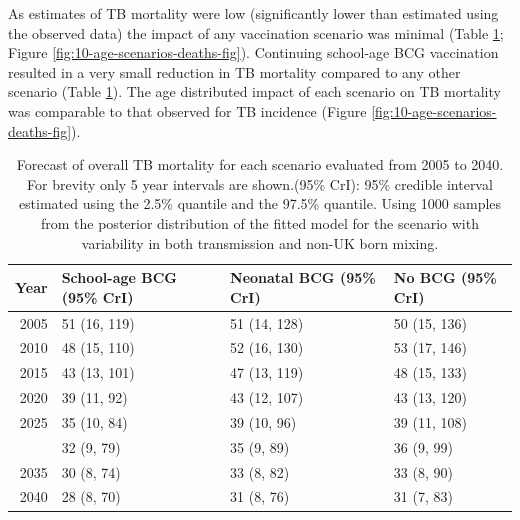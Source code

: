 \documentclass[11pt,twoside]{bristolthesis}
\begin{document}
  As estimates of TB mortality were low (significantly lower than estimated using the observed data) the impact of any vaccination scenario was minimal (Table \ref{tab:10-table-deaths-preds}; Figure \ref{fig:10-age-scenarios-deaths-fig}). Continuing school-age BCG vaccination resulted in a very small reduction in TB mortality compared to any other scenario (Table \ref{tab:10-table-deaths-preds}). The age distributed impact of each scenario on TB mortality was comparable to that observed for TB incidence (Figure \ref{fig:10-age-scenarios-deaths-fig}).
  \begin{longtable}{rlll}
  \caption[Forecast of overall TB mortality for each scenario evaluated from 2005 to 2040.]{\label{tab:10-table-deaths-preds}Forecast of overall TB mortality for each scenario evaluated from 2005 to 2040. For brevity only 5 year intervals are shown.(95\% CrI): 95\% credible interval estimated using the 2.5\% quantile and the 97.5\% quantile. Using 1000 samples from the posterior distribution of the fitted model for the scenario with variability in both transmission and non-UK born mixing.}\\
  \toprule
  Year & School-age BCG (95\% CrI) & Neonatal BCG (95\% CrI) & No BCG (95\% CrI)\\
  \midrule
  2005 & 51 (16, 119) & 51 (14, 128) & 50 (15, 136)\\
  2010 & 48 (15, 110) & 52 (16, 130) & 53 (17, 146)\\
  2015 & 43 (13, 101) & 47 (13, 119) & 48 (15, 133)\\
  2020 & 39 (11, 92) & 43 (12, 107) & 43 (13, 120)\\
  2025 & 35 (10, 84) & 39 (10, 96) & 39 (11, 108)\\
  \addlinespace
  2030 & 32 (9, 79) & 35 (9, 89) & 36 (9, 99)\\
  2035 & 30 (8, 74) & 33 (8, 82) & 33 (8, 90)\\
  2040 & 28 (8, 70) & 31 (8, 76) & 31 (7, 83)\\
  \bottomrule
  \end{longtable}
\end{document}

